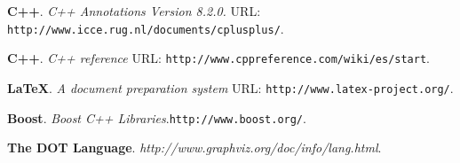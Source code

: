 \begin{thebibliography}{10}
 \textbf{C++}. \textit{C++ Annotations Version 8.2.0.} URL: \texttt{http://www.icce.rug.nl/documents/cplusplus/}. 

 \textbf{C++}. \textit{C++ reference} URL: \texttt{http://www.cppreference.com/wiki/es/start}. 

 \textbf{\LaTeX}. \textit{A document preparation system} URL: \texttt{http://www.latex-project.org/}.

 \textbf{Boost}. \textit{Boost C++ Libraries}.\texttt{http://www.boost.org/}. 

 \textbf{The DOT Language}. \textit{http://www.graphviz.org/doc/info/lang.html}.
 
\end{thebibliography}



